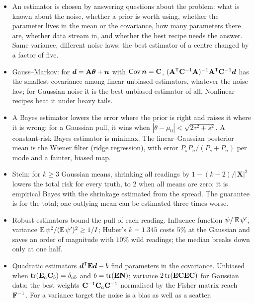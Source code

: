 \begin{recap}
\begin{itemize}[itemsep=1pt,leftmargin=1.2em]
  \item An estimator is chosen by answering questions about the problem: what is known about the noise, whether a prior is worth using, whether the parameter lives in the mean or the covariance, how many parameters there are, whether data stream in, and whether the best recipe needs the answer. Same variance, different noise laws: the best estimator of a centre changed by a factor of five.
  \item Gauss--Markov: for $\bm{d}=\mathbf A\bm{\theta}+\bm n$ with $\operatorname{Cov}\bm n=\mathbf{C}$, $(\mathbf A^{\mathsf{T}}\mathbf{C}^{-1}\mathbf A)^{-1}\mathbf A^{\mathsf{T}}\mathbf{C}^{-1}\bm{d}$ has the smallest covariance among linear unbiased estimators, whatever the noise law; for Gaussian noise it is the best unbiased estimator of all. Nonlinear recipes beat it under heavy tails.
  \item A Bayes estimator lowers the error where the prior is right and raises it where it is wrong: for a Gaussian pull, it wins when $|\theta-\mu_0|<\sqrt{2\tau^2+s^2}$. A constant-risk Bayes estimator is minimax. The linear--Gaussian posterior mean is the Wiener filter (ridge regression), with error $P_sP_n/(P_s+P_n)$ per mode and a fainter, biased map.
  \item Stein: for $k\ge3$ Gaussian means, shrinking all readings by $1-(k-2)/|\bm X|^2$ lowers the total risk for every truth, to $2$ when all means are zero; it is empirical Bayes with the shrinkage estimated from the spread. The guarantee is for the total; one outlying mean can be estimated three times worse.
  \item Robust estimators bound the pull of each reading. Influence function $\psi/\E\psi'$, variance $\E\psi^2/(\E\psi')^2\ge1/I$; Huber's $k=1.345$ costs $5\%$ at the Gaussian and saves an order of magnitude with $10\%$ wild readings; the median breaks down only at one half.
  \item Quadratic estimators $\bm{d}^{\mathsf{T}}\mathbf E\bm{d}-b$ find parameters in the covariance. Unbiased when $\operatorname{tr}(\mathbf E_a\mathbf{C}_b)=\delta_{ab}$ and $b=\operatorname{tr}(\mathbf E\mathbf N)$; variance $2\operatorname{tr}(\mathbf E\mathbf{C}\mathbf E\mathbf{C})$ for Gaussian data; the best weights $\mathbf{C}^{-1}\mathbf{C}_a\mathbf{C}^{-1}$ normalised by the Fisher matrix reach $\mathbf{F}^{-1}$. For a variance target the noise is a bias as well as a scatter.
\end{itemize}
\end{recap}

